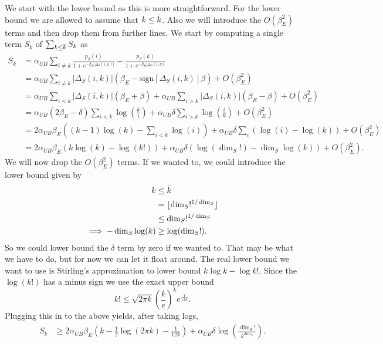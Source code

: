 \documentclass{article}
\newcommand{\parens}[1]{\left( #1 \right)}
\newcommand{\bigo}[1]{O\left( #1 \right)}
\begin{document}
We start with the lower bound as this is more straightforward. For the lower bound we are allowed to assume that $k \leq \Bar{k}$. Also we will introduce the $\bigo{\beta_E^2}$ terms and then drop them from further lines. We start by computing a single term $S_k$ of $\sum_{k \leq \Bar{k}} S_k$ as 
\begin{align}
    S_k &= \alpha_{UB} \sum_{i \neq k} \frac{p_{\beta}(i)}{1 + e^{-\beta_E |\Delta_S(i,k)|}} - \frac{p_{\beta}(k)}{1 + e^{+\beta_E |\Delta_S(i, k)}} \\
    &= \alpha_{UB} \sum_{i \neq k} |\Delta_S(i,k)| \parens{\beta_E - \text{sign} \left[\Delta_S(i,k)\right] \beta} + \bigo{\beta_E^2} \\
    &= \alpha_{UB} \sum_{i < k} |\Delta_S(i,k)| (\beta_E + \beta) + \alpha_{UB} \sum_{i > k} |\Delta_S(i,k)| (\beta_E - \beta) + \bigo{\beta_E^2} \\
    &= \alpha_{UB} (2 \beta_E - \delta) \sum_{i < k} \log \left( \frac{k}{i} \right) + \alpha_{UB} \delta \sum_{i > k} \log \left( \frac{i}{k} \right) + \bigo{\beta_E^2} \\
    &= 2 \alpha_{UB} \beta_E \parens{(k-1) \log(k) - \sum_{i < k} \log(i)} + \alpha_{UB} \delta \sum_{i} (\log (i) - \log(k)) + \bigo{\beta_E^2} \\ 
    &= 2 \alpha_{UB} \beta_E \parens{k \log (k) - \log(k!)} + \alpha_{UB} \delta \parens{\log (\dim_S !) - \dim_S \log(k)} + \bigo{\beta_E^2}. \label{eq:s_k_sum_equality}
\end{align}
We will now drop the $\bigo{\beta_E^2}$ terms. If we wanted to, we could introduce the lower bound given by 
\begin{align}
    k &\leq \Bar{k} \\
    &= \lfloor \dim_S!^{1/\dim_S} \rfloor \\
    &\leq \dim_S!^{1/\dim_S} \\
    \implies -\dim_S \log (k) &\geq \log(\dim_S!).
\end{align}
So we could lower bound the $\delta$ term by zero if we wanted to. That may be what we have to do, but for now we can let it float around. The real lower bound we want to use is Stirling's approximation to lower bound $k \log k - \log k!$. Since the $\log(k!)$ has a minus sign we use the exact upper bound
$$
k! \leq \sqrt{2 \pi k} \parens{\frac{k}{e}}^k e^{\frac{1}{12 k}}. 
$$
Plugging this in to the above yields, after taking logs,
\begin{align}
    S_k &\geq 2 \alpha_{UB} \beta_E \parens{k -\frac{1}{2} \log(2 \pi k) - \frac{1}{12 k}}  + \alpha_{UB} \delta \log \parens{\frac{\dim_S!}{k^{\dim_S}}}.
\end{align}
\end{document}

